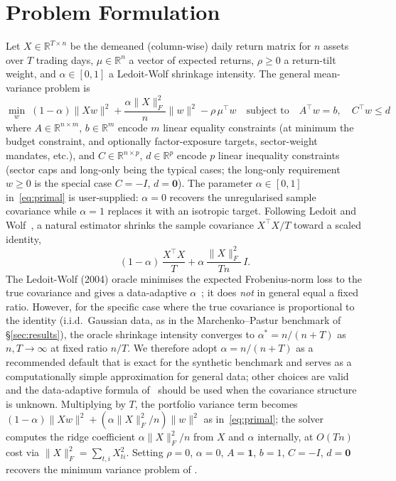 \documentclass{siam/siamart}
\begin{document}
\section{Problem Formulation}\label{sec:problem}

Let $X \in \mathbb{R}^{T \times n}$ be the demeaned (column-wise) daily return matrix for
$n$ assets over $T$ trading days, $\mu \in \mathbb{R}^n$ a vector of expected returns,
$\rho \geq 0$ a return-tilt weight, and $\alpha \in [0,1]$ a Ledoit-Wolf shrinkage intensity.  The general mean-variance
problem is
\begin{equation}\label{eq:primal}
\min_{w} \; (1-\alpha)\|Xw\|^2 + \frac{\alpha\|X\|_F^2}{n}\|w\|^2 - \rho\,\mu^\top w
\quad \text{subject to} \quad
A^\top w = b, \quad C^\top w \leq d
\end{equation}
where $A \in \mathbb{R}^{n \times m}$, $b \in \mathbb{R}^m$ encode $m$ linear equality constraints
(at minimum the budget constraint, and optionally factor-exposure targets, sector-weight mandates, etc.),
and $C \in \mathbb{R}^{n \times p}$, $d \in \mathbb{R}^p$ encode $p$ linear inequality constraints
(sector caps and long-only being the typical cases; the long-only requirement $w \geq 0$ is the special case $C = -I$, $d = \mathbf{0}$).
The parameter $\alpha \in [0,1]$ in~\eqref{eq:primal} is user-supplied: $\alpha=0$
recovers the unregularised sample covariance while $\alpha=1$ replaces it with an
isotropic target.  Following Ledoit and Wolf~\cite{ledoit2004}, a natural estimator
shrinks the sample covariance $X^\top X / T$ toward a scaled identity,
\[
  (1-\alpha)\,\frac{X^\top X}{T} + \alpha\,\frac{\|X\|_F^2}{Tn}\,I.
\]
The Ledoit-Wolf (2004) oracle minimises the expected Frobenius-norm loss to the
true covariance and gives a data-adaptive $\alpha$~\cite{ledoit2004}; it does
\emph{not} in general equal a fixed ratio.  However, for the specific case where
the true covariance is proportional to the identity (i.i.d.\ Gaussian data, as in
the Marchenko--Pastur benchmark of \S\ref{sec:results}), the oracle shrinkage
intensity converges to $\alpha^* = n/(n+T)$ as $n, T \to \infty$ at fixed ratio
$n/T$.  We therefore adopt $\alpha = n/(n+T)$ as a recommended default that is
exact for the synthetic benchmark and serves as a computationally simple
approximation for general data; other choices are valid and the data-adaptive
formula of~\cite{ledoit2004} should be used when the covariance structure is
unknown.  Multiplying by $T$, the portfolio variance term becomes
$(1-\alpha)\|Xw\|^2 + (\alpha\|X\|_F^2/n)\|w\|^2$ as in~\eqref{eq:primal}; the
solver computes the ridge coefficient $\alpha\|X\|_F^2/n$ from $X$ and $\alpha$
internally, at $O(Tn)$ cost via $\|X\|_F^2 = \sum_{t,i}X_{ti}^2$.
Setting $\rho = 0$, $\alpha = 0$, $A = \mathbf{1}$, $b = 1$, $C = -I$, $d = \mathbf{0}$
recovers the minimum variance problem of \cite{minvar_paper}.
\end{document}
